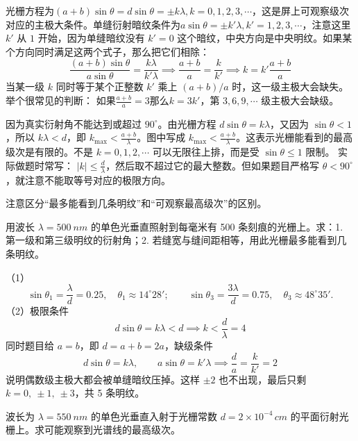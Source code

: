 \documentclass[lang=cn,11pt]{elegantbook}
\begin{document}
\begin{definition}[缺级现象]
    光栅方程为$(a+b)\sin\theta=d\sin\theta=\pm k\lambda,k=0,1,2,3,\cdots$，这是屏上可观察级次对应的主极大条件。单缝衍射暗纹条件为$a\sin\theta=\pm k'\lambda,k'=1,2,3,\cdots$，注意这里 \(k'\) 从 \(1\) 开始，因为单缝暗纹没有 \(k'=0\) 这个暗纹，中央方向是中央明纹。如果某个方向同时满足这两个式子，那么把它们相除：
\[
\frac{(a+b)\sin\theta}{a\sin\theta}
=
\frac{k\lambda}{k'\lambda}\implies
\frac{a+b}{a}=\frac{k}{k'}\implies
k=k'\frac{a+b}{a}
\]当某一级 \(k\) 同时等于某个正整数 \(k'\) 乘上 \((a+b)/a\) 时，这一级主极大会缺失。举个很常见的判断：
如果$\frac{a+b}{a}=3$那么$k=3k'$，第 \(3,6,9,\cdots\) 级主极大会缺级。
\end{definition}

\begin{theorem}[屏上可观察的最高级次]
因为真实衍射角不能达到或超过 \(90^\circ\)。由光栅方程 \(d\sin\theta=k\lambda\)，又因为 \(\sin\theta<1\)，所以 \(k\lambda<d\)，即 \(k_{\max}<\frac{a+b}{\lambda}\)。图中写成 \(k_{\max}<\frac{a+b}{\lambda}\)。这表示光栅能看到的最高级次是有限的。不是 \(k=0,1,2,\cdots\) 可以无限往上排，而是受 \(\sin\theta\le 1\) 限制。
实际做题时常写：
\(|k|\le \frac{d}{\lambda}\)，然后取不超过它的最大整数。但如果题目严格写 \(\theta<90^\circ\)，就注意不能取等号对应的极限方向。
\end{theorem}
注意区分“最多能看到几条明纹”和“可观察最高级次”的区别。
\begin{exercise}
用波长 \(\lambda=\SI{500}{nm}\) 的单色光垂直照射到每毫米有 500 条刻痕的光栅上。求：1. 第一级和第三级明纹的衍射角；2. 若缝宽与缝间距相等，用此光栅最多能看到几条明纹。
\end{exercise}

\begin{solution}
（1）
 \[\sin\theta_1=\frac{\lambda}{d}=0.25,\quad \theta_1\approx14^\circ 28';\qquad \sin\theta_3=\frac{3\lambda}{d}=0.75,\quad \theta_3\approx48^\circ 35'.\]
 （2）极限条件\[d\sin\theta=k\lambda< d\implies k<\frac{d}{\lambda}=4\]
同时题目给 \(a=b\)，即 \(d=a+b=2a\)，缺级条件
 \[d\sin\theta=k\lambda,\qquad a\sin\theta=k'\lambda \implies \frac{d}{a}=\frac{k}{k'}=2\]
说明偶数级主极大都会被单缝暗纹压掉。这样 \(\pm2\) 也不出现，最后只剩 \(k=0,\ \pm1,\ \pm3\)，共 5 条明纹。
\end{solution}

\begin{exercise}
波长为 \(\lambda=\SI{550}{nm}\) 的单色光垂直入射于光栅常数 \(d=2\times10^{-4}\,\si{cm}\) 的平面衍射光栅上。求可能观察到光谱线的最高级次。
\end{exercise}
\end{document}
